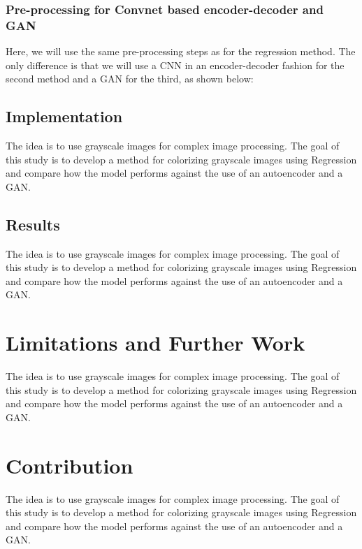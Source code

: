 \documentclass{article}
\begin{document}
\subsubsection{Pre-processing for Convnet based encoder-decoder and GAN}
Here, we will use the same pre-processing steps as for the regression method. The only difference is that we will use a CNN in an encoder-decoder fashion for the second method and a GAN for the third, as shown below:

\subsection{Implementation}
The idea is to use grayscale images for complex image processing. The goal of this
study is to develop a method for colorizing grayscale images using Regression and
compare how the model performs against the use of an autoencoder and a GAN. 

\subsection{Results}
The idea is to use grayscale images for complex image processing. The goal of this
study is to develop a method for colorizing grayscale images using Regression and
compare how the model performs against the use of an autoencoder and a GAN. 

\section{Limitations and Further Work}
The idea is to use grayscale images for complex image processing. The goal of this
study is to develop a method for colorizing grayscale images using Regression and
compare how the model performs against the use of an autoencoder and a GAN. 

\section{Contribution}
The idea is to use grayscale images for complex image processing. The goal of this
study is to develop a method for colorizing grayscale images using Regression and
compare how the model performs against the use of an autoencoder and a GAN. 
\cite{1}
\cite{2}
\cite{3}
\cite{4}
\cite{5}
\cite{6}


\end{document}
